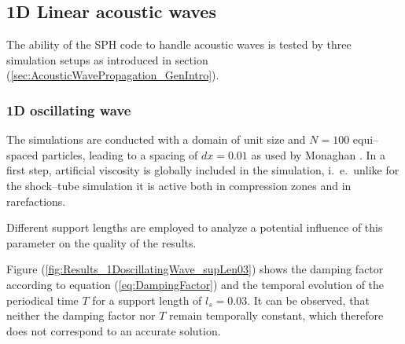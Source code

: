 \documentclass[11pt,a4paper,twoside]{report}
\begin{document}
\subsection{1D Linear acoustic waves}
\label{sec:Results_1DLinearAcousticWaves}
The ability of the SPH code to handle acoustic waves is tested by three simulation setups as introduced in section (\ref{sec:AcousticWavePropagation_GenIntro}). 



\subsubsection{1D oscillating wave}
\label{sec:Results_1DoscillatingWave}
The simulations are conducted with a domain of unit size and $N=100$ equi--spaced particles, leading to a spacing of $dx=0.01$ as used by Monaghan \cite{Monaghan2005}.
In a first step, artificial viscosity is globally included in the simulation, i.\ e.\ unlike for the shock--tube simulation it is active both in compression zones and in rarefactions. 

Different support lengths are employed to analyze a potential influence of this parameter on the quality of the results.

 Figure (\ref{fig:Results_1DoscillatingWave_supLen03}) shows the damping factor according to equation (\ref{eq:DampingFactor}) and the temporal evolution of the periodical time $T$ for a support length of $l_s=0.03$. It can be observed, that neither the damping factor nor $T$ remain temporally constant, which therefore does not correspond to an accurate solution.  
\end{document}
